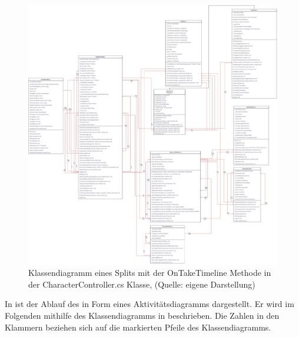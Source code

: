 \begin{figure}[ht]
\centering
\includegraphics[width=1\linewidth]{content/pictures/Split_Class.jpg}
\caption{Klassendiagramm eines Splits mit der OnTakeTimeline Methode in der CharacterController.cs Klasse, (Quelle: eigene Darstellung)}
\label{fig:split-class}
\end{figure}

In  ist der Ablauf des  in Form eines Aktivitätsdiagramms dargestellt. Er wird im Folgenden mithilfe des Klassendiagramms in  beschrieben. Die Zahlen in den Klammern beziehen sich auf die markierten Pfeile des Klassendiagramms.

